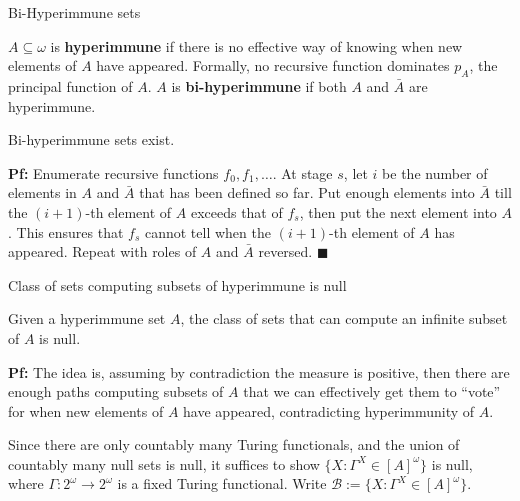 \begin{frame}{Bi-Hyperimmune sets}
  \begin{define}
    $A\subseteq\omega$ is \textbf{hyperimmune} if there is no effective way
    of knowing when new elements of $A$ have appeared.  Formally, no
    recursive function dominates $p_A$, the principal function of $A$. $A$
    is \textbf{bi-hyperimmune} if both $A$ and $\bar{A}$ are hyperimmune.
  \end{define}

  \begin{thm}
    Bi-hyperimmune sets exist.
  \end{thm}

  \textbf{Pf:} Enumerate recursive functions $f_0,f_1,\ldots$. At stage
  $s$, let $i$ be the number of elements in $A$ and $\bar{A}$ that has been
  defined so far. Put enough elements into $\bar{A}$ till the $(i+1)$-th
  element of $A$ exceeds that of $f_s$, then put the next element into $A$.
  This ensures that $f_s$ cannot tell when the $(i+1)$-th element of $A$
  has appeared. Repeat with roles of $A$ and $\bar{A}$ reversed.
  $\blacksquare$
\end{frame}

\begin{frame}{Class of sets computing subsets of hyperimmune is null}
  \begin{thm}
    \label{thm:bihyper-null}
    Given a hyperimmune set $A$, the class of sets that can compute an
    infinite subset of $A$ is null.
  \end{thm}

  \vspace{1em}
  \textbf{Pf:} The idea is, assuming by contradiction the measure is
  positive, then there are enough paths computing subsets of $A$ that we
  can effectively get them to ``vote'' for when new elements of $A$
  have appeared, contradicting hyperimmunity of $A$.

  \vspace{1em}
  Since there are only countably many Turing functionals, and the union of
  countably many null sets is null, it suffices to show $\{X:
  \Gamma^X\in[A]^\omega\}$ is null, where
  $\Gamma:2^\omega\rightarrow2^\omega$ is a fixed Turing functional.
  Write $\mathcal{B} :=\{X: \Gamma^X\in[A]^\omega\}$.
\end{frame}

